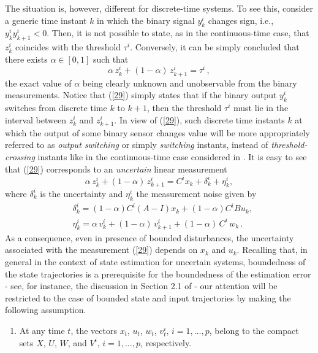 \documentclass[11pt,journal,onecolumn]{IEEEtran}
\newcommand{\be}{\begin{equation}}
\newcommand{\ee}{\end{equation}}
\begin{document}
The situation is, however, different for discrete-time systems. To see this, consider a generic time instant $k$ in which the binary signal $y_k^i$ changes sign, i.e., $y_{k}^{i}y_{k+1}^{i}<0$. Then, it is not possible to state, as in the continuous-time case, that $z_{k}^{i}$ coincides with the threshold $\tau^i$. Conversely, it can be simply concluded that there exists $\alpha \in [0,1]$ such that
\begin{equation}\label{29}
\alpha \, z_{k}^{i}+(1-\alpha) \, z_{k+1}^{i}=\tau^{i} \, ,
\end{equation}
the exact value of $\alpha$ being clearly unknown and unobservable from the binary measurements. Notice that (\ref{29}) simply states that if the binary output $y_k^i$ switches from discrete time $k$ to $k+1$, then the threshold $\tau^i$ must lie in the interval between $z_k^i$ and $z_{k+1}^i$. In view of (\ref{29}), such discrete time instants $k$ at which the output of some binary sensor changes value will be more appropriately referred to as \textit{output switching} or simply \textit{switching} instants, instead of \textit{threshold-crossing} instants like in the continuous-time case considered in \cite{Irr-sampling}. It is easy to see that (\ref{29}) corresponds to an {\em uncertain} linear measurement
\be\label{4}
\alpha \, z_{k}^{i}+(1-\alpha) \, z_{k+1}^{i} = C^i x_{k} + \delta^i_{k} + \eta^i_{k},
\ee
where $\delta^i_{k} $ is the uncertainty and $\eta^i_{k}$ the measurement noise given by
\begin{equation*}
\begin{split}
&\delta^i_{k} = (1-\alpha)C^{i}(A-I)x_{k}+(1-\alpha)C^{i}Bu_{k}, \\
&\eta^i_{k}   = \alpha\, v_{k}^{i}+(1-\alpha) \, v_{k+1}^{i} + (1-\alpha) \, C^{i} \, w_{k} \, .
\end{split}
\end{equation*}
As a consequence, even in presence of bounded disturbances, the uncertainty associated with the measurement (\ref{29}) depends on $x_k$ and $u_k$.
Recalling that, in general in the context of state estimation for uncertain systems, boundedness of the state trajectories is a prerequisite for the boundedness of the estimation error - see, for instance, the discussion in Section 2.1 of \cite{BlMi} - our attention will be restricted to the case of bounded state and input trajectories by making the following assumption. \vspace{.3cm}

\begin{enumerate}[\bf {A}1]
\item At any time $t$, the vectors $x_t$, $u_t$, $w_t$, $v^i_t, \, i=1, \ldots, p$, belong to the compact sets $X$, $U$, $W$, and $V^i, \, i=1, \ldots,p$, respectively.
\end{enumerate} \vspace{.3cm}
\end{document}
